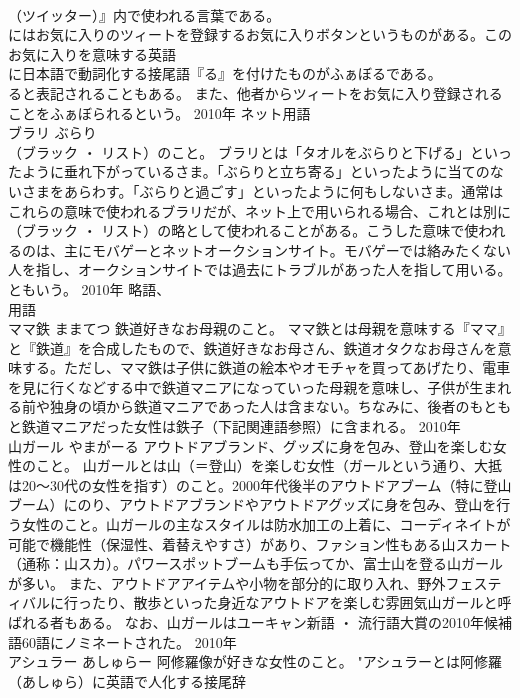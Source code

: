 \documentclass[8pt]{extreport}
\begin{document}
\begin{CJK}{UTF8}{min}
\\	（ツイッター）』内で使われる言葉である。
\\	にはお気に入りのツィートを登録するお気に入りボタンというものがある。このお気に入りを意味する英語
\\	に日本語で動詞化する接尾語『る』を付けたものがふぁぼるである。
\\	ると表記されることもある。 また、他者からツィートをお気に入り登録されることをふぁぼられるという。	2010年	ネット用語	
\\	ブラリ	ぶらり	
\\	（ブラック ・ リスト）のこと。	ブラリとは「タオルをぶらりと下げる」といったように垂れ下がっているさま。「ぶらりと立ち寄る」といったように当てのないさまをあらわす。「ぶらりと過ごす」といったように何もしないさま。通常はこれらの意味で使われるブラリだが、ネット上で用いられる場合、これとは別に
\\	（ブラック ・ リスト）の略として使われることがある。こうした意味で使われるのは、主にモバゲーとネットオークションサイト。モバゲーでは絡みたくない人を指し、オークションサイトでは過去にトラブルがあった人を指して用いる。
\\	ともいう。	2010年	略語、
\\	用語	
\\	ママ鉄	ままてつ	鉄道好きなお母親のこと。	ママ鉄とは母親を意味する『ママ』と『鉄道』を合成したもので、鉄道好きなお母さん、鉄道オタクなお母さんを意味する。ただし、ママ鉄は子供に鉄道の絵本やオモチャを買ってあげたり、電車を見に行くなどする中で鉄道マニアになっていった母親を意味し、子供が生まれる前や独身の頃から鉄道マニアであった人は含まない。ちなみに、後者のもともと鉄道マニアだった女性は鉄子（下記関連語参照）に含まれる。	2010年	
\\	山ガール	やまがーる	アウトドアブランド、グッズに身を包み、登山を楽しむ女性のこと。	山ガールとは山（＝登山）を楽しむ女性（ガールという通り、大抵は20～30代の女性を指す）のこと。2000年代後半のアウトドアブーム（特に登山ブーム）にのり、アウトドアブランドやアウトドアグッズに身を包み、登山を行う女性のこと。山ガールの主なスタイルは防水加工の上着に、コーディネイトが可能で機能性（保湿性、着替えやすさ）があり、ファション性もある山スカート（通称：山スカ）。パワースポットブームも手伝ってか、富士山を登る山ガールが多い。 また、アウトドアアイテムや小物を部分的に取り入れ、野外フェスティバルに行ったり、散歩といった身近なアウトドアを楽しむ雰囲気山ガールと呼ばれる者もある。 なお、山ガールはユーキャン新語 ・ 流行語大賞の2010年候補語60語にノミネートされた。	2010年	
\\	アシュラー	あしゅらー	阿修羅像が好きな女性のこと。	"アシュラーとは阿修羅（あしゅら）に英語で人化する接尾辞

\end{CJK}
\end{document}
